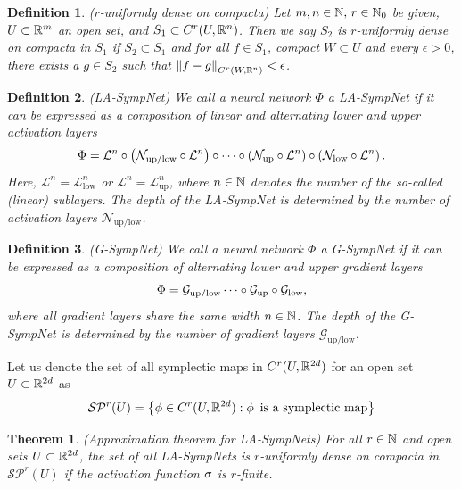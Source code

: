 \documentclass[twoside,a4paper]{article}
\newtheorem{definition}{Definition}
\newtheorem{theorem}{Theorem}
\begin{document}
\begin{definition}
	($r$-uniformly dense on compacta)
	Let $m,n \in \mathbb{N}, \, r \in \mathbb{N}_0$ be given, $U \subset \mathbb{R}^m$ an open set,
	and $S_1 \subset C^r(U,\mathbb{R}^n)$. Then we say $S_2$ is $r$-uniformly dense
	on compacta in $S_1$ if $S_2 \subset S_1$ and for all $f \in S_1$, compact
	$W \subset U$ and every $\epsilon > 0$, there exists a $g \in S_2$ such that
	$\left\lVert{f-g}\right\rVert_{C^r(W,\mathbb{R}^n)} < \epsilon$.
\end{definition}

\begin{definition}\label{def_la_sympnet}
	(LA-SympNet)
	We call a neural network $\Phi$ a LA-SympNet if it can be expressed as
	a composition of linear and alternating lower and upper activation layers
	\begin{equation*}
		\Phi = \mathcal{L}^n
		\circ \left( \mathcal{N}_{\text{up/low}} \circ \mathcal{L}^n \right) \circ
		\cdots
		\circ \left( \mathcal{N}_{\text{up}} \circ \mathcal{L}^n \right)
		\circ \left( \mathcal{N}_{\text{low}} \circ \mathcal{L}^n \right)
		.
	\end{equation*}
	Here, $\mathcal{L}^n = \mathcal{L}_{\text{low}}^n$ or $\mathcal{L}^n = \mathcal{L}_{\text{up}}^n$,
	where $n \in \mathbb{N}$ denotes the number of the so-called (linear) sublayers.
	The depth of the LA-SympNet is determined by the number of activation layers
	$\mathcal{N}_{\text{up/low}}$.
\end{definition}

\begin{definition}\label{def_g_sympnet}
	(G-SympNet)
	We call a neural network $\Phi$ a G-SympNet if it can be expressed as a composition
	of alternating lower and upper gradient layers
	\begin{equation*}
		\Phi = \mathcal{G}_{\text{up/low}} \cdots \circ \mathcal{G}_{\text{up}} \circ \mathcal{G}_{\text{low}},
	\end{equation*}
	where all gradient layers share the same width $n \in \mathbb{N}$.
	The depth of the G-SympNet is determined by the number of gradient layers
	$\mathcal{G}_{\text{up/low}}$.
\end{definition}

Let us denote the set of all symplectic maps in $C^r(U, \mathbb{R}^{2d})$ for an open set $U \subset \mathbb{R}^{2d}$ as
\begin{equation*}
	\mathcal{S}\mathcal{P}^r(U) = \left\{ 
		\phi \in C^r(U, \mathbb{R}^{2d}) : \phi \, \text{ is a symplectic map}
	\right\}
\end{equation*}

\begin{theorem}
	(Approximation theorem for LA-SympNets)
	For all $r \in \mathbb{N}$ and open sets $U \subset \mathbb{R}^{2d}$, the set of all LA-SympNets
	is $r$-uniformly dense on compacta in $\mathcal{S}\mathcal{P}^r(U)$ if the activation function
	$\sigma$ is $r$-finite.
\end{theorem}
\end{document}
